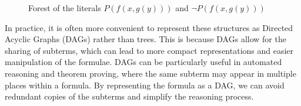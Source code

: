 \begin{figure}[H]
    \centering
    \begin{minipage}[t]{0.48\textwidth}
        \centering
    \end{minipage}
    \hfill
    \begin{minipage}[t]{0.48\textwidth}
        \centering
    \end{minipage}
    \caption{Forest of the literals \(P(f(x, g(y)))\) and \(\neg P(f(x, g(y)))\)}\label{fig:subterm_forest}
\end{figure}


In practice, it is often more convenient to represent these structures as Directed Acyclic Graphs (DAGs) rather than trees. This is because DAGs allow for the sharing of subterms, which can lead to more compact representations and easier manipulation of the formulae.
DAGs can be particularly useful in automated reasoning and theorem proving, where the same subterm may appear in multiple places within a formula. By representing the formula as a DAG, we can avoid redundant copies of the subterms and simplify the reasoning process.

